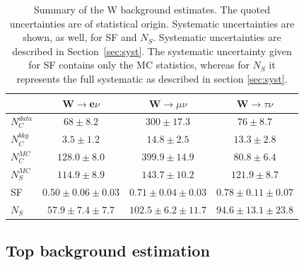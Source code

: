 \begin{table}[!htp]
\centering
\begin{tabular}{|l|c|c|c|}
\hline
 & W$\rightarrow$e$\nu$ & W$\rightarrow\mu\nu$ & W$\rightarrow\tau\nu$ \\
\hline\hline
$N_{C}^{data}$ & $68\pm 8.2$& $300\pm 17.3$ & $76\pm 8.7$\\
$N_{C}^{bkg}$   &$3.5\pm 1.2$ & $14.8\pm 2.5$ & $13.3\pm 2.8$ \\
$N_{C}^{MC}$ &  $128.0\pm 8.0$ & $399.9\pm 14.9$ & $80.8\pm 6.4$   \\
$N_{S}^{MC}$ & $114.9\pm8.9$ & $143.7\pm10.2$ & $121.9\pm8.7$  \\
\hline\hline
SF & $0.50\pm0.06\pm0.03$ & $0.71\pm0.04\pm0.03$ & $0.78\pm0.11\pm0.07$ \\
\hline\hline
$N_{S}$ & $57.9\pm7.4\pm7.7$ & $102.5\pm6.2\pm11.7$ & $94.6\pm13.1\pm23.8$ \\
\hline
\end{tabular}
\caption{\label{tab:ZWTopRes} Summary of the W background estimates. The quoted uncertainties are of statistical origin. Systematic uncertainties are shown, as well, for SF and $N_S$. Systematic uncertainties are described in Section~\ref{sec:syst}. The systematic uncertainty given for SF contains only the MC statistics, whereas for $N_{S}$ it represents the full systematic as described in section \ref{sec:syst}.}
\end{table}


\subsection{Top background estimation}



